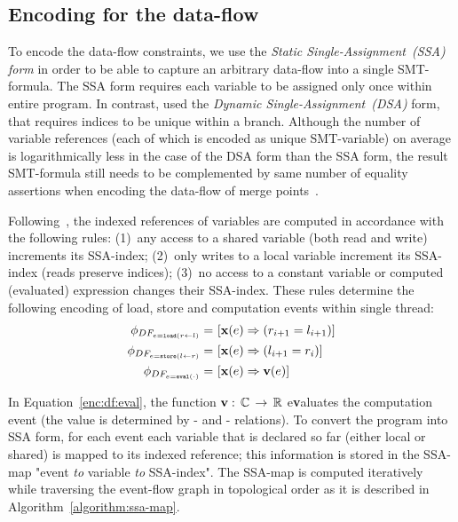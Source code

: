 \subsection{Encoding for the data-flow}
\label{ch:enc:bmc:df}

To encode the data-flow constraints, we use the \textit{Static Single-Assignment~(SSA) form} in order to be able to capture an arbitrary data-flow into a single SMT-formula.
The SSA form requires each variable to be assigned only once within entire program.
In contrast, \porthos{} used the \textit{Dynamic Single-Assignment~(DSA)} form, that requires indices to be unique within a branch.
Although the number of variable references (each of which is encoded as unique SMT-variable) on average is logarithmically less in the case of the DSA form than the SSA form, the result SMT-formula still needs to be complemented by same number of equality assertions when encoding the data-flow of merge points~\cite{Porthos17a}.

Following~\cite{Porthos17b}, the indexed references of variables are computed in accordance with the following rules:
(1)~any access to a shared variable (both read and write) increments its SSA-index;
(2)~only writes to a local variable increment its SSA-index (reads preserve indices);
(3)~no access to a constant variable or computed (evaluated) expression changes their SSA-index.
These rules determine the following encoding of load, store and computation events within single thread:
%
\begin{align}
    \phi_{DF_{e = \texttt{load}(r \leftarrow l)}}  \defeq \ & [\fx(e) \Rightarrow (r_{i+1} = l_{i+1})] \label{enc:df:load} \\
    \phi_{DF_{e = \texttt{store}(l \leftarrow r)}} \defeq \ & [\fx(e) \Rightarrow (l_{i+1} = r_i)] \label{enc:df:store} \\
    \phi_{DF_{e = \texttt{eval}(\cdot)}}           \defeq \ & [\fx(e) \Rightarrow \fv(e)] \label{enc:df:eval} %
\end{align}

In Equation~\ref{enc:df:eval}, the function $\mathbf{v}:\,\mathbb{C}\,\rightarrow\,\mathbb{R}$ e\textbf{v}aluates the computation event (the value is determined by \co- and \rf- relations).
To convert the program into SSA form, for each event each variable that is declared so far (either local or shared) is mapped to its indexed reference; this information is stored in the SSA-map "event \textit{to} variable \textit{to} SSA-index". %
The SSA-map is computed iteratively while traversing the event-flow graph in topological order as it is described in Algorithm~\ref{algorithm:ssa-map}.

